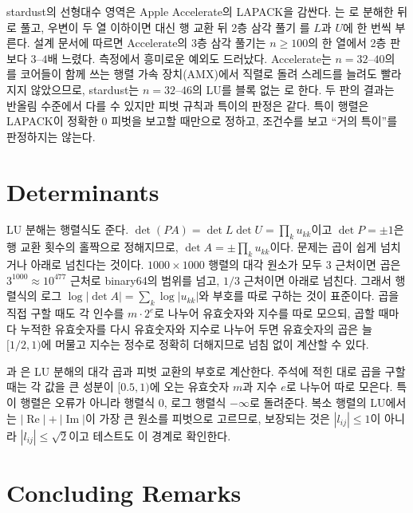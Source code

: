 \begin{instardust}
stardust의 선형대수 영역은 Apple Accelerate의 LAPACK을 감싼다. 는 로 분해한 뒤 로 풀고, 우변이 두 열 이하이면  대신 행 교환 뒤 2층 삼각 풀기 를 $L$과 $U$에 한 번씩 부른다. 설계 문서에 따르면 Accelerate의 3층 삼각 풀기는 $n\ge100$의 한 열에서 2층 판보다 $3$--$4$배 느렸다. 측정에서 흥미로운 예외도 드러났다. Accelerate는 $n=32$--$40$의 를 코어들이 함께 쓰는 행렬 가속 장치(AMX)에서 직렬로 돌려 스레드를 늘려도 빨라지지 않았으므로, stardust는 $n=32$--$46$의 LU를 블록 없는 로 한다. 두 판의 결과는 반올림 수준에서 다를 수 있지만 피벗 규칙과 특이의 판정은 같다. 특이 행렬은 LAPACK이 정확한 $0$ 피벗을 보고할 때만으로 정하고, 조건수를 보고 ``거의 특이''를 판정하지는 않는다.
\end{instardust}

\section{Determinants}
\label{sec:determinant}

LU 분해는 행렬식도 준다. $\det(PA)=\det L\det U=\prod_ku_{kk}$이고 $\det P=\pm1$은 행 교환 횟수의 홀짝으로 정해지므로, $\det A=\pm\prod_ku_{kk}$이다. 문제는 곱이 쉽게 넘치거나 아래로 넘친다는 것이다. $1000\times1000$ 행렬의 대각 원소가 모두 $3$ 근처이면 곱은 $3^{1000}\approx10^{477}$ 근처로 binary64의 범위를 넘고, $1/3$ 근처이면 아래로 넘친다. 그래서 행렬식의 로그 $\log|\det A|=\sum_k\log|u_{kk}|$와 부호를 따로 구하는 것이 표준이다. 곱을 직접 구할 때도 각 인수를 $m\cdot2^e$로 나누어 유효숫자와 지수를 따로 모으되, 곱할 때마다 누적한 유효숫자를 다시 유효숫자와 지수로 나누어 두면 유효숫자의 곱은 늘 $[1/2,1)$에 머물고 지수는 정수로 정확히 더해지므로 넘침 없이 계산할 수 있다.

\begin{instardust}
과 은 LU 분해의 대각 곱과 피벗 교환의 부호로 계산한다. 주석에 적힌 대로 곱을 구할 때는 각 값을 큰 성분이 $[0.5,1)$에 오는 유효숫자 $m$과 지수 $e$로 나누어 따로 모은다. 특이 행렬은 오류가 아니라 행렬식 $0$, 로그 행렬식 $-\infty$로 돌려준다. 복소 행렬의 LU에서 는 $|\operatorname{Re}|+|\operatorname{Im}|$이 가장 큰 원소를 피벗으로 고르므로, 보장되는 것은 $|l_{ij}|\le1$이 아니라 $|l_{ij}|\le\sqrt2$이고 테스트도 이 경계로 확인한다.
\end{instardust}

\section{Concluding Remarks}

